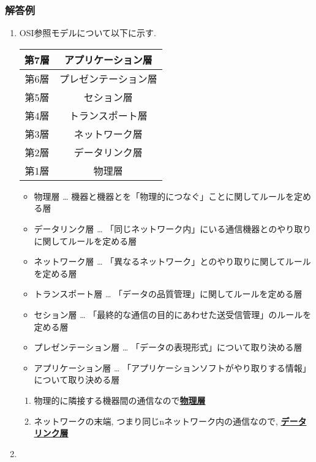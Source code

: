 \documentclass[dvipdfmx,titlepage, 11pt, a4paper]{jsarticle}%
\begin{document}
\subsubsection{解答例}
\begin{enumerate}[(1)]
  \setlength{\itemsep}{15pt}
\item OSI参照モデルについて以下に示す.
  \begin{center}
    \begin{tabular}{|c|c|} \hline
      第7層&アプリケーション層 \\ \hline
      第6層&プレゼンテーション層 \\ \hline
      第5層&セション層 \\ \hline
      第4層&トランスポート層 \\ \hline
      第3層&ネットワーク層 \\ \hline
      第2層&データリンク層 \\ \hline
      第1層&物理層 \\ \hline
    \end{tabular}
  \end{center}
  \begin{itemize}
  \item 物理層 … 機器と機器とを「物理的につなぐ」ことに関してルールを定める層
  \item データリンク層 … 「同じネットワーク内」にいる通信機器とのやり取りに関してルールを定める層
  \item ネットワーク層 … 「異なるネットワーク」とのやり取りに関してルールを定める層
  \item トランスポート層 … 「データの品質管理」に関してルールを定める層
  \item セション層 … 「最終的な通信の目的にあわせた送受信管理」のルールを定める層
  \item プレゼンテーション層 … 「データの表現形式」について取り決める層
  \item アプリケーション層 … 「アプリケーションソフトがやり取りする情報」について取り決める層
  \end{itemize}
  \vspace{0.3cm}
  
  \begin{enumerate}[({1}$-$a)]
    \setlength{\itemsep}{5pt}
  \item 物理的に隣接する機器間の通信なので\underline{\bf 物理層}
  \item ネットワークの末端, つまり同じnネットワーク内の通信なので, \underline{\bf データリンク層}
  \end{enumerate}
\item 
\end{enumerate}
\end{document}
